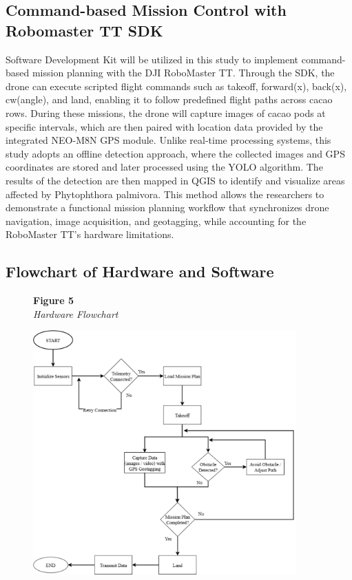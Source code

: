 \subsection{Command-based Mission Control with Robomaster TT SDK}
Software Development Kit will be utilized in this study to implement command-based mission planning with the DJI RoboMaster TT. Through the SDK, the drone can execute scripted flight commands such as takeoff, forward(x), back(x), cw(angle), and land, enabling it to follow predefined flight paths across cacao rows. During these missions, the drone will capture images of cacao pods at specific intervals, which are then paired with location data provided by the integrated NEO-M8N GPS module. Unlike real-time processing systems, this study adopts an offline detection approach, where the collected images and GPS coordinates are stored and later processed using the YOLO algorithm. The results of the detection are then mapped in QGIS to identify and visualize areas affected by Phytophthora palmivora. This method allows the researchers to demonstrate a functional mission planning workflow that synchronizes drone navigation, image acquisition, and geotagging, while accounting for the RoboMaster TT’s hardware limitations.

\subsection{Flowchart of Hardware and Software}

\begin{figure}[H]
	\raggedright
	\textbf{Figure 5} \\ %
	\textit{Hardware Flowchart} %

	\vspace{0.5em}
	\centering
	\includegraphics[width=0.9\textwidth]{figures/HardFlow.pdf} %

	\vspace{0.5em}
	\raggedright

	\label{fig:HardFlow}
\end{figure}

